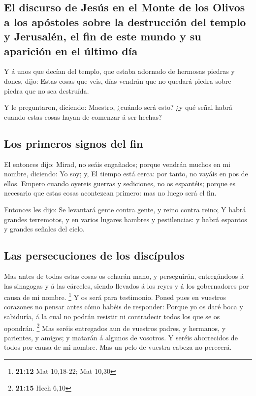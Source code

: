 \hypertarget{el-discurso-de-jesuxfas-en-el-monte-de-los-olivos-a-los-apuxf3stoles-sobre-la-destrucciuxf3n-del-templo-y-jerusaluxe9n-el-fin-de-este-mundo-y-su-apariciuxf3n-en-el-uxfaltimo-duxeda}{%
\subsection{El discurso de Jesús en el Monte de los Olivos a los
apóstoles sobre la destrucción del templo y Jerusalén, el fin de este
mundo y su aparición en el último
día}\label{el-discurso-de-jesuxfas-en-el-monte-de-los-olivos-a-los-apuxf3stoles-sobre-la-destrucciuxf3n-del-templo-y-jerusaluxe9n-el-fin-de-este-mundo-y-su-apariciuxf3n-en-el-uxfaltimo-duxeda}}

 Y á unos que decían del templo, que estaba adornado de
hermosas piedras y dones, dijo:  Estas cosas que veis,
días vendrán que no quedará piedra sobre piedra que no sea destruída.

 Y le preguntaron, diciendo: Maestro, ¿cuándo será esto?
¿y qué señal habrá cuando estas cosas hayan de comenzar á ser hechas?

\hypertarget{los-primeros-signos-del-fin}{%
\subsection{Los primeros signos del
fin}\label{los-primeros-signos-del-fin}}

 El entonces dijo: Mirad, no seáis engañados; porque
vendrán muchos en mi nombre, diciendo: Yo soy; y, El tiempo está cerca:
por tanto, no vayáis en pos de ellos.  Empero cuando
oyereis guerras y sediciones, no os espantéis; porque es necesario que
estas cosas acontezcan primero: mas no luego será el fin.

 Entonces les dijo: Se levantará gente contra gente, y
reino contra reino;  Y habrá grandes terremotos, y en
varios lugares hambres y pestilencias: y habrá espantos y grandes
señales del cielo.

\hypertarget{las-persecuciones-de-los-discuxedpulos}{%
\subsection{Las persecuciones de los
discípulos}\label{las-persecuciones-de-los-discuxedpulos}}

 Mas antes de todas estas cosas os echarán mano, y
perseguirán, entregándoos á las sinagogas y á las cárceles, siendo
llevados á los reyes y á los gobernadores por causa de mi nombre.
\footnote{\textbf{21:12} Mat 10,18-22; Mat 10,30}  Y os
será para testimonio.  Poned pues en vuestros corazones
no pensar antes cómo habéis de responder:  Porque yo os
daré boca y sabiduría, á la cual no podrán resistir ni contradecir todos
los que se os opondrán. \footnote{\textbf{21:15} Hech 6,10}
 Mas seréis entregados aun de vuestros padres, y
hermanos, y parientes, y amigos; y matarán á algunos de vosotros.
 Y seréis aborrecidos de todos por causa de mi nombre.
 Mas un pelo de vuestra cabeza no perecerá.

